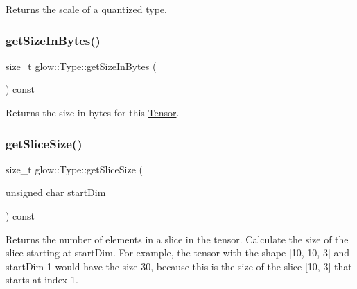 \begin{DoxyReturn}{Returns}
the scale of a quantized type. 
\end{DoxyReturn}
\mbox{\label{structglow_1_1_type_a136383839b7414ad54835c1b3574b858}} 
\subsubsection{\texorpdfstring{get\+Size\+In\+Bytes()}{getSizeInBytes()}}
{\footnotesize\ttfamily size\+\_\+t glow\+::\+Type\+::get\+Size\+In\+Bytes (\begin{DoxyParamCaption}{ }\end{DoxyParamCaption}) const\hspace{0.3cm}{\ttfamily [inline]}}

\begin{DoxyReturn}{Returns}
the size in bytes for this \hyperlink{classglow_1_1_tensor}{Tensor}. 
\end{DoxyReturn}
\mbox{\label{structglow_1_1_type_a612cc055d21d2e7402b0859f5dce35b2}} 
\subsubsection{\texorpdfstring{get\+Slice\+Size()}{getSliceSize()}}
{\footnotesize\ttfamily size\+\_\+t glow\+::\+Type\+::get\+Slice\+Size (\begin{DoxyParamCaption}\item[{unsigned char}]{start\+Dim }\end{DoxyParamCaption}) const\hspace{0.3cm}{\ttfamily [inline]}}

\begin{DoxyReturn}{Returns}
the number of elements in a slice in the tensor. Calculate the size of the slice starting at {\ttfamily start\+Dim}. For example, the tensor with the shape \mbox{[}10, 10, 3\mbox{]} and start\+Dim 1 would have the size 30, because this is the size of the slice \mbox{[}10, 3\mbox{]} that starts at index 1. 
\end{DoxyReturn}
\mbox{\label{structglow_1_1_type_af3e7be136c7e3fbe626d4e997c35081c}} 
